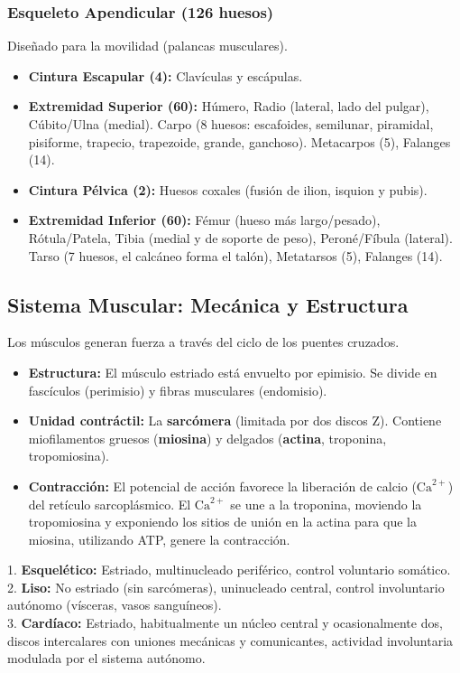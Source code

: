 \subsubsection{Esqueleto Apendicular (126 huesos)}
Diseñado para la movilidad (palancas musculares).
\begin{itemize}
    \item \textbf{Cintura Escapular (4):} Clavículas y escápulas.
    \item \textbf{Extremidad Superior (60):} Húmero, Radio (lateral, lado del pulgar), Cúbito/Ulna (medial). Carpo (8 huesos: escafoides, semilunar, piramidal, pisiforme, trapecio, trapezoide, grande, ganchoso). Metacarpos (5), Falanges (14).
    \item \textbf{Cintura Pélvica (2):} Huesos coxales (fusión de ilion, isquion y pubis).
    \item \textbf{Extremidad Inferior (60):} Fémur (hueso más largo/pesado), Rótula/Patela, Tibia (medial y de soporte de peso), Peroné/Fíbula (lateral). Tarso (7 huesos, el calcáneo forma el talón), Metatarsos (5), Falanges (14).
\end{itemize}

\subsection{Sistema Muscular: Mecánica y Estructura}
Los músculos generan fuerza a través del ciclo de los puentes cruzados.
\begin{itemize}
    \item \textbf{Estructura:} El músculo estriado está envuelto por epimisio. Se divide en fascículos (perimisio) y fibras musculares (endomisio).
    \item \textbf{Unidad contráctil:} La \textbf{sarcómera} (limitada por dos discos Z). Contiene miofilamentos gruesos (\textbf{miosina}) y delgados (\textbf{actina}, troponina, tropomiosina).
    \item \textbf{Contracción:} El potencial de acción favorece la liberación de calcio ($\mathrm{Ca}^{2+}$) del retículo sarcoplásmico. El $\mathrm{Ca}^{2+}$ se une a la troponina, moviendo la tropomiosina y exponiendo los sitios de unión en la actina para que la miosina, utilizando ATP, genere la contracción.
\end{itemize}
\begin{tcolorbox}[colback=red!5!white,colframe=red!75!black,title=Clasificación del Tejido Muscular]
1. \textbf{Esquelético:} Estriado, multinucleado periférico, control voluntario somático.\\
2. \textbf{Liso:} No estriado (sin sarcómeras), uninucleado central, control involuntario autónomo (vísceras, vasos sanguíneos).\\
3. \textbf{Cardíaco:} Estriado, habitualmente un núcleo central y ocasionalmente dos, discos intercalares con uniones mecánicas y comunicantes, actividad involuntaria modulada por el sistema autónomo.
\end{tcolorbox}

